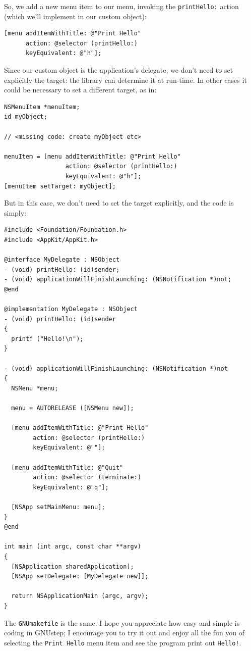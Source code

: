 \documentclass[a4paper]{article}
\begin{document}
So, we add a new menu item to our menu, invoking the
\texttt{printHello:} action (which we'll implement in our custom
object):
\begin{verbatim}
[menu addItemWithTitle: @"Print Hello"  
      action: @selector (printHello:)  
      keyEquivalent: @"h"];
\end{verbatim}
Since our custom object is the application's delegate, we don't need
to set explicitly the target: the library can determine it at
run-time.  In other cases it could be necessary to set a different
target, as in:
\begin{verbatim}
NSMenuItem *menuItem;
id myObject;

// <missing code: create myObject etc>

menuItem = [menu addItemWithTitle: @"Print Hello"  
                 action: @selector (printHello:)  
                 keyEquivalent: @"h"];
[menuItem setTarget: myObject];
\end{verbatim}

But in this case, we don't need to set the target explicitly, and the
code is simply:
\begin{verbatim}
#include <Foundation/Foundation.h>
#include <AppKit/AppKit.h>

@interface MyDelegate : NSObject
- (void) printHello: (id)sender;
- (void) applicationWillFinishLaunching: (NSNotification *)not;
@end

@implementation MyDelegate : NSObject 
- (void) printHello: (id)sender
{
  printf ("Hello!\n");
}

- (void) applicationWillFinishLaunching: (NSNotification *)not
{
  NSMenu *menu;

  menu = AUTORELEASE ([NSMenu new]);

  [menu addItemWithTitle: @"Print Hello"  
        action: @selector (printHello:)  
        keyEquivalent: @""];

  [menu addItemWithTitle: @"Quit"  
        action: @selector (terminate:)  
        keyEquivalent: @"q"];

  [NSApp setMainMenu: menu];
}
@end

int main (int argc, const char **argv)
{ 
  [NSApplication sharedApplication];
  [NSApp setDelegate: [MyDelegate new]];

  return NSApplicationMain (argc, argv);
}
\end{verbatim}
The \texttt{GNUmakefile} is the same.  I hope you appreciate how easy
and simple is coding in GNUstep; I encourage you to try it out and
enjoy all the fun you of selecting the \texttt{Print Hello} menu item
and see the program print out \texttt{Hello!}.
\end{document}
